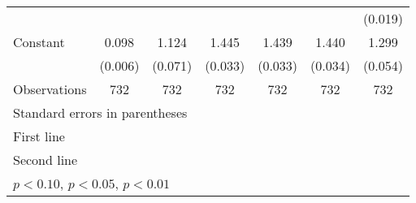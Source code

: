 \begin{table}[htbp]
\begin{tabular}{l*{6}{c}}
                    &                     &                     &                     &                     &                     &     (0.019)         \\
\addlinespace
Constant            &       0.098\sym{***}&       1.124\sym{***}&       1.445\sym{***}&       1.439\sym{***}&       1.440\sym{***}&       1.299\sym{***}\\
                    &     (0.006)         &     (0.071)         &     (0.033)         &     (0.033)         &     (0.034)         &     (0.054)         \\
\midrule
Observations        &         732         &         732         &         732         &         732         &         732         &         732         \\
\bottomrule
\multicolumn{7}{l}{\footnotesize Standard errors in parentheses}\\
\multicolumn{7}{l}{\footnotesize First line}\\
\multicolumn{7}{l}{\footnotesize Second line}\\
\multicolumn{7}{l}{\footnotesize \sym{*} \(p<0.10\), \sym{**} \(p<0.05\), \sym{***} \(p<0.01\)}\\
\end{tabular}
\end{table}
